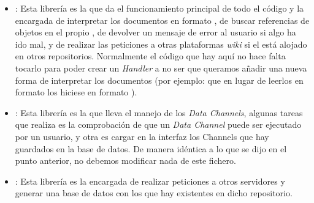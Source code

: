 \begin{itemize}
    \item {}: Esta librería es la que da el funcionamiento principal de todo el código y la encargada de interpretar los documentos en formato \yaml{}, de buscar referencias de objetos en el propio \profile{}, de devolver un mensaje de error al usuario si algo ha ido mal, y de realizar las peticiones a otras plataformas \textit{wiki} si el \profile{} está alojado en otros repositorios. Normalmente el código que hay aquí no hace falta tocarlo para poder crear un \textit{Handler} a no ser que queramos añadir una nueva forma de interpretar los documentos (por ejemplo: que en lugar de leerlos en formato \yaml{} los hiciese en formato \json{}).

\item {}: Esta librería es la que lleva el manejo de los \textit{Data Channels}, algunas tareas que realiza es la comprobación de que un \textit{Data Channel} puede ser ejecutado por un usuario, y otra es cargar en la interfaz los Channels que hay guardados en la base de datos. De manera idéntica a lo que se dijo en el punto anterior, no debemos modificar nada de este fichero.

\item {}: Esta librería es la encargada de realizar peticiones a otros servidores y generar una base de datos con los \profiles{} que hay existentes en dicho repositorio.


\end{itemize}
